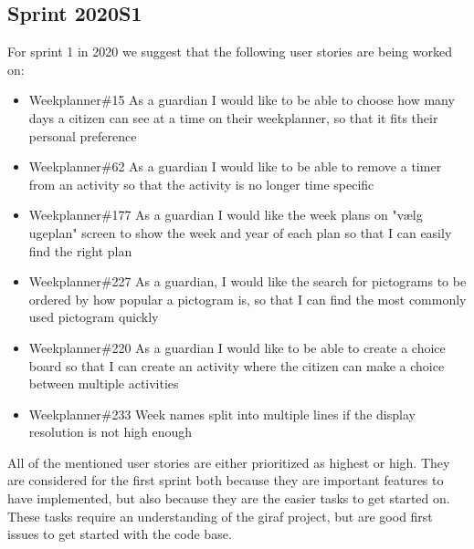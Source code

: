 \subsection{Sprint 2020S1}
For sprint 1 in 2020 we suggest that the following user stories are being worked on:

\begin{itemize}
    \item Weekplanner\#15 As a guardian I would like to be able to choose how many days a citizen can see at a time on their weekplanner, so that it fits their personal preference 
    \item Weekplanner\#62 As a guardian I would like to be able to remove a timer from an activity so that the activity is no longer time specific
    \item Weekplanner\#177 As a guardian I would like the week plans on "vælg ugeplan" screen to show the week and year of each plan so that I can easily find the right plan 
    \item Weekplanner\#227 As a guardian, I would like the search for pictograms to be ordered by how popular a pictogram is, so that I can find the most commonly used pictogram quickly
    \item Weekplanner\#220 As a guardian I would like to be able to create a choice board so that I can create an activity where the citizen can make a choice between multiple activities 
    \item Weekplanner\#233 Week names split into multiple lines if the display resolution is not high enough 
\end{itemize}
\noindent
All of the mentioned user stories are either prioritized as highest or high. 
They are considered for the first sprint both because they are important features to have implemented, but also because they are the easier tasks to get started on.
These tasks require an understanding of the giraf project, but are good first issues to get started with the code base.
